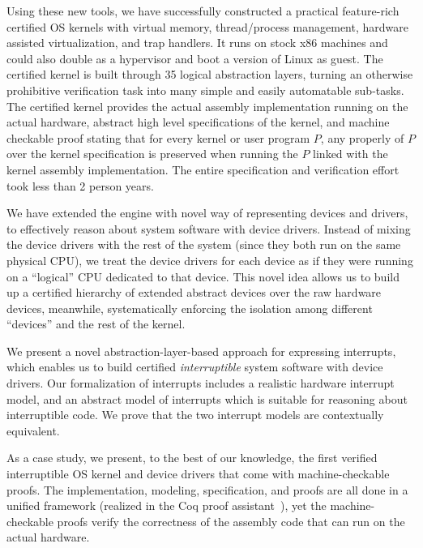 \begin{itemize}
{\item Using these new tools, we have successfully constructed a
practical feature-rich certified OS kernels with virtual memory,
thread/process management, hardware assisted virtualization,
and trap handlers. It runs on stock x86 machines
and could also double as a hypervisor and boot a version of Linux as guest.
The certified kernel is built through 35 logical
abstraction layers, turning
an otherwise prohibitive verification task into many simple
and easily automatable sub-tasks.
The certified
kernel provides the actual assembly implementation running on the
actual hardware, abstract high level specifications of the kernel,
and machine checkable proof stating that for every kernel or user
program $P$, any properly of $P$ over the kernel specification
is preserved when running the $P$ linked with the kernel assembly
implementation.  The entire specification and verification
effort took less than 2 person years.
}

\item We have extended the engine with novel way of representing
devices and drivers, to effectively reason about system software
with device drivers.
Instead of mixing the device drivers
  with the rest of the system (since they both run on the same
  physical CPU), we treat the device drivers for each device as if
  they were running on a ``logical'' CPU dedicated to that device.
  This novel idea allows us to build up a certified hierarchy of
  extended abstract devices over the raw hardware devices, meanwhile,
  systematically enforcing the isolation among different ``devices''
  and the rest of the kernel.

\item We present a novel abstraction-layer-based approach for
  expressing interrupts, which enables us to build certified
  {\em interruptible} system software with device drivers. Our formalization of
  interrupts includes a realistic hardware interrupt model, and an
  abstract model of interrupts which is suitable for reasoning about
  interruptible code. We prove that the two interrupt models are
  contextually equivalent.

\item As a case study, we present, to the best of our knowledge, the first verified
  interruptible OS kernel and device drivers that come with
  machine-checkable proofs.  The implementation, modeling, specification, and
  proofs are all done in a unified framework (realized in the Coq
  proof assistant~\cite{coq}), yet the machine-checkable proofs verify the
  correctness of the assembly code that can run on the actual
  hardware.
  

\end{itemize}
